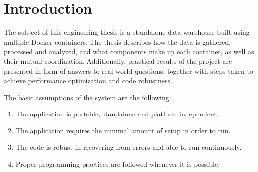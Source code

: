 \chapter{Introduction}
\label{ch:intro}
The subject of this engineering thesis is a standalone data warehouse built using multiple Docker containers. The thesis describes how the data is gathered, processed and analyzed, and what components make up each container, as well as their mutual coordination. Additionally, practical results of the project are presented in form of answers to real-world questions, together with steps taken to achieve performance optimization and code robustness. \par
The basic assumptions of the system are the following:
\begin{enumerate}
    \item The application is portable, standalone and platform-independent.
    \item The application requires the minimal amount of setup in order to run.
    \item The code is robust in recovering from errors and able to run continuously.
    \item Proper programming practices are followed whenever it is possible.
\end{enumerate}


